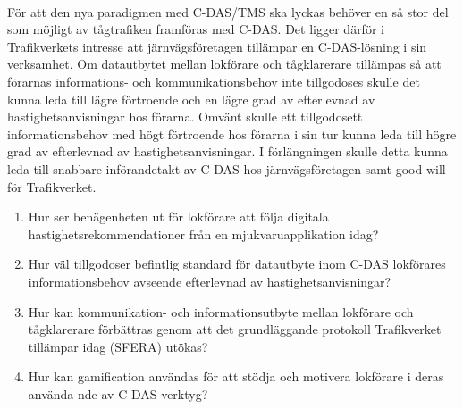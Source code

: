 \paragraph{}
\hspace{-11pt}För att den nya paradigmen med C-DAS/TMS ska lyckas behöver en så stor del som möjligt av tågtrafiken framföras med C-DAS\@.
Det ligger därför i Trafikverkets intresse att järnvägsföretagen tillämpar en C-DAS-lösning i sin verksamhet.
Om datautbytet mellan lokförare och tågklarerare tillämpas så att förarnas informations- och kommunikationsbehov inte tillgodoses skulle det kunna leda till lägre förtroende och en lägre grad av efterlevnad av hastighetsanvisningar hos förarna.
Omvänt skulle ett tillgodosett informationsbehov med högt förtroende hos förarna i sin tur kunna leda till högre grad av efterlevnad av hastighetsanvisningar.
I förlängningen skulle detta kunna leda till snabbare införandetakt av C-DAS hos järnvägsföretagen samt good-will för Trafikverket.
\begin{enumerate}
    \item Hur ser benägenheten ut för lokförare att följa digitala hastighetsrekommendationer från en mjukvaruapplikation idag?
    \item Hur väl tillgodoser befintlig standard för datautbyte inom C-DAS lokförares informationsbehov avseende efterlevnad av hastighetsanvisningar?
    \item Hur kan kommunikation- och informationsutbyte mellan lokförare och tågklarerare förbättras genom att det grundläggande protokoll Trafikverket tillämpar idag (SFERA) utökas?
    \item Hur kan gamification användas för att stödja och motivera lokförare i deras använda-nde av C-DAS-verktyg?
\end{enumerate}